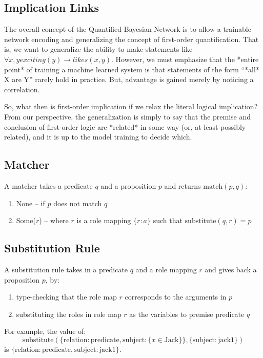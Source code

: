 \documentclass[12pt]{article}
\begin{document}
\subsection{Implication Links}
The overall concept of the Quantified Bayesian Network is to allow a trainable network encoding and generalizing the concept of first-order quantification.
That is, we want to generalize the ability to make statements like $\forall x, y exciting(y) \rightarrow likes(x, y)$.
However, we must emphasize that the *entire point* of training a machine learned system is that statements of the form ``*all* X are Y'' rarely hold in practice.
But, advantage is gained merely by noticing a correlation.

So, what then is first-order implication if we relax the literal logical implication?
From our perspective, the generalization is simply to say that the premise and conclusion of first-order logic are *related* in some way (or, at least possibly related), and it is up to the model training to decide which.

\subsection{Matcher}
A matcher takes a predicate \( q \) and a proposition \( p \) and returns \( \text{match}(p, q) \):
\begin{enumerate}
    \item None -- if \( p \) does not match \( q \)
    \item Some(\( r \)) -- where \( r \) is a role mapping \( \{r: a\} \) such that \( \text{substitute}(q, r) = p \)
\end{enumerate}

\subsection{Substitution Rule}
A substitution rule takes in a predicate \( q \) and a role mapping \( r \) and gives back a proposition \( p \), by:
\begin{enumerate}
    \item type-checking that the role map \( r \) corresponds to the arguments in \( p \)
    \item substituting the roles in role map \( r \) as the variables to premise predicate \( q \)
\end{enumerate}

For example, the value of:
\[ \text{substitute}(\{\text{relation}: \text{predicate}, \text{subject}:\{x \in \text{Jack}\}\}, \{\text{subject}:\text{jack1}\}) \]
is \( \{\text{relation}: \text{predicate}, \text{subject}:\text{jack1}\} \).
\end{document}
